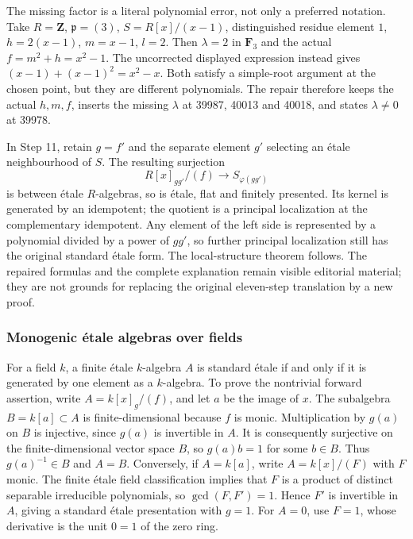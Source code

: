 The missing factor is a literal polynomial error, not only a preferred notation. Take \(R=\mathbf Z\), \(\mathfrak p=(3)\), \(S=R[x]/(x-1)\), distinguished residue element \(1\), \(h=2(x-1)\), \(m=x-1\), \(l=2\). Then \(\lambda=2\) in \(\mathbf F_3\) and the actual \(f=m^2+h=x^2-1\). The uncorrected displayed expression instead gives \((x-1)+(x-1)^2=x^2-x\). Both satisfy a simple-root argument at the chosen point, but they are different polynomials. The repair therefore keeps the actual \(h,m,f\), inserts the missing \(\lambda\) at 39987, 40013 and 40018, and states \(\lambda\ne0\) at 39978.

In Step 11, retain \(g=f'\) and the separate element \(g'\) selecting an étale neighbourhood of \(S\). The resulting surjection \[
R[x]_{gg'}/(f)\longrightarrow S_{\varphi(gg')}
\] is between étale \(R\)-algebras, so is étale, flat and finitely presented. Its kernel is generated by an idempotent; the quotient is a principal localization at the complementary idempotent. Any element of the left side is represented by a polynomial divided by a power of \(gg'\), so further principal localization still has the original standard étale form. The local-structure theorem follows. The repaired formulas and the complete explanation remain visible editorial material; they are not grounds for replacing the original eleven-step translation by a new proof.

\subsubsection{Monogenic étale algebras over fields}\label{algebra-proof-052-monogenic-uxe9tale-algebras-over-fields}

For a field \(k\), a finite étale \(k\)-algebra \(A\) is standard étale if and only if it is generated by one element as a \(k\)-algebra. To prove the nontrivial forward assertion, write \(A=k[x]_g/(f)\), and let \(a\) be the image of \(x\). The subalgebra \(B=k[a]\subset A\) is finite-dimensional because \(f\) is monic. Multiplication by \(g(a)\) on \(B\) is injective, since \(g(a)\) is invertible in \(A\). It is consequently surjective on the finite-dimensional vector space \(B\), so \(g(a)b=1\) for some \(b\in B\). Thus \(g(a)^{-1}\in B\) and \(A=B\). Conversely, if \(A=k[a]\), write \(A=k[x]/(F)\) with \(F\) monic. The finite étale field classification implies that \(F\) is a product of distinct separable irreducible polynomials, so \(\gcd(F,F')=1\). Hence \(F'\) is invertible in \(A\), giving a standard étale presentation with \(g=1\). For \(A=0\), use \(F=1\), whose derivative is the unit \(0=1\) of the zero ring.

